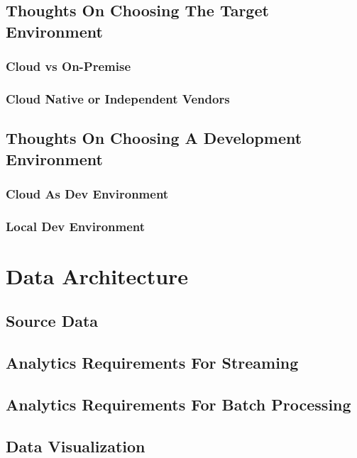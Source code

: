 \documentclass[12pt]{scrartcl} %
\begin{document}
\subsection{Thoughts On Choosing The Target Environment}

\subsubsection{Cloud vs On-Premise}

\subsubsection{Cloud Native or Independent Vendors}

\subsection{Thoughts On Choosing A Development Environment}

\subsubsection{Cloud As Dev Environment}

\subsubsection{Local Dev Environment}

 
 

\section{Data Architecture}

\subsection{Source Data} 

\subsection{Analytics Requirements For Streaming}  

\subsection{Analytics Requirements For Batch Processing}

\subsection{Data Visualization}
 
\end{document}
